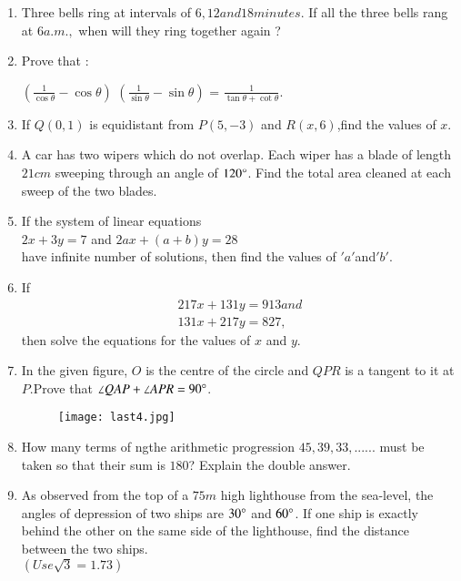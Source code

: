 \documentclass[12pt,-letter paper]{article}
\providecommand{\brak}[1]{\ensuremath{\left(#1\right)}}
\begin{document}
\begin{enumerate}
\item Three bells ring at intervals of $ 6, 12 and 18 minutes$. If all the three bells rang at $ 6 a.m.,$ when will they ring together again ?

\item Prove that :
	\begin{center}
		$\brak{\frac{1}{\cos\theta}-\cos\theta}$ $\brak{\frac{1}{\sin\theta}-\sin\theta}$ = $\frac{1}{\tan\theta + \cot\theta}$.
	\end{center}

\item If $Q\brak{0,1}$ is equidistant from $P\brak{5,-3}$ and $R\brak{x,6}$,find the values of $x$.	

\item A car has two wipers which do not overlap. Each wiper has a blade of length $21 cm$ sweeping through an angle of $120\degree$. Find the total area cleaned at each sweep of the two blades.

\item If the system of linear equations  \\ 		
	$2x + 3y = 7$ and $2ax + \brak{a+b}y = 28$ \\
\text have infinite number of solutions, then find the values of $' a '$and$' b '$.

\item If
\begin{align*}
	 217x + 131y = 913 and \\
         131x + 217y = 827,
\end{align*}
 then solve the equations for the values of $x$ and $y$.

\item In the given figure, $O$ is the centre of the circle and $QPR$ is a tangent to it at $P$.Prove that $\angle QAP + \angle APR = 90\degree$.

	\begin{figure}[!ht]
		\centering
		\texttt{[image: last4.jpg]}
		\caption{}
		\label{fig:enter-label}
	\end{figure}

\item How many terms of ngthe arithmetic progression $45,39,33,......$ must be taken so that their sum is $180$? Explain the double answer.

\item As observed from the top of a $75 m$ high lighthouse from the sea-level, the angles of depression of two ships are $30\degree$ and $60\degree$. If one ship is exactly behind the other on the same side of the lighthouse, find the distance between the two ships.\\
	$\brak{Use \sqrt{3} = 1.73}$


\end{enumerate}
\end{document}
